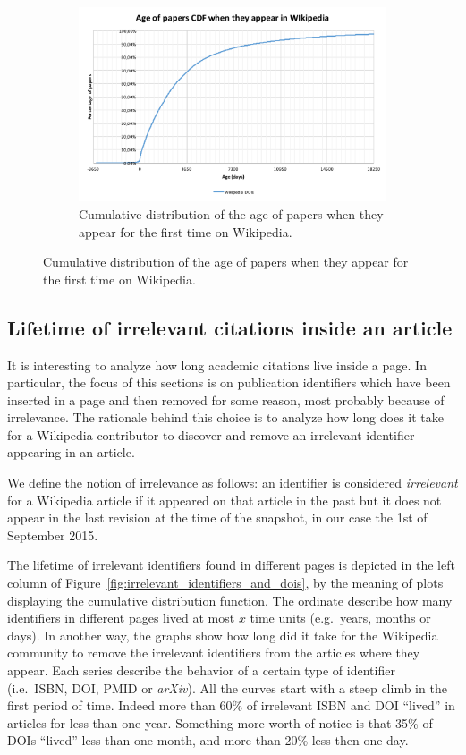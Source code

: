 \begin{figure}[h]
\begin{subfigure}{1\textwidth}
        \includegraphics[keepaspectratio=true, width=\linewidth]{assets/age_of_papers_at_first_appearance_cdf}
        \caption{Cumulative distribution of the age of papers when they appear for the first time on Wikipedia.}
\label{fig:age_of_papers_at_first_appearance_cdf}
    \end{subfigure}
\end{figure}

\subsection{Lifetime of irrelevant citations inside an article}
It is interesting to analyze how long academic citations live inside a page.
In particular, the focus of this sections is on publication identifiers which have been inserted in a page and then removed for some reason, most probably because of irrelevance.
The rationale behind this choice is to analyze how long does it take for a Wikipedia contributor to discover and remove an irrelevant identifier appearing in an article.

We define the notion of irrelevance as follows: an identifier is considered \emph{irrelevant} for a Wikipedia article if it appeared on that article in the past but it does not appear in the last revision at the time of the snapshot, in our case the 1st of September 2015.

The lifetime of irrelevant identifiers found in different pages is depicted in the left column of Figure~\ref{fig:irrelevant_identifiers_and_dois}, by the meaning of plots displaying the cumulative distribution function.
The ordinate describe how many identifiers in different pages lived at most $x$ time units (e.g.\ years, months or days).
In another way, the graphs show how long did it take for the Wikipedia community to remove the irrelevant identifiers from the articles where they appear.
Each series describe the behavior of a certain type of identifier (i.e.\ \ac{ISBN}, \ac{DOI}, \ac{PMID} or \emph{arXiv}).
All the curves start with a steep climb in the first period of time.
Indeed more than 60\% of irrelevant \ac{ISBN} and \ac{DOI} ``lived'' in articles for less than one year.
Something more worth of notice is that 35\% of \acp{DOI} ``lived'' less than one month, and more than 20\% less then one day.

